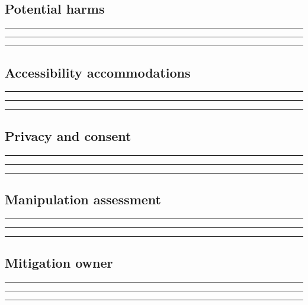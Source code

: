 \documentclass[11pt]{article}
\begin{document}
\subsection{Potential harms}
\noindent\rule{\linewidth}{0.3pt}\par\vspace{0.18in}
\noindent\rule{\linewidth}{0.3pt}\par\vspace{0.18in}
\noindent\rule{\linewidth}{0.3pt}\par\vspace{0.14in}

\subsection{Accessibility accommodations}
\noindent\rule{\linewidth}{0.3pt}\par\vspace{0.18in}
\noindent\rule{\linewidth}{0.3pt}\par\vspace{0.18in}
\noindent\rule{\linewidth}{0.3pt}\par\vspace{0.14in}

\subsection{Privacy and consent}
\noindent\rule{\linewidth}{0.3pt}\par\vspace{0.18in}
\noindent\rule{\linewidth}{0.3pt}\par\vspace{0.18in}
\noindent\rule{\linewidth}{0.3pt}\par\vspace{0.14in}

\subsection{Manipulation assessment}
\noindent\rule{\linewidth}{0.3pt}\par\vspace{0.18in}
\noindent\rule{\linewidth}{0.3pt}\par\vspace{0.18in}
\noindent\rule{\linewidth}{0.3pt}\par\vspace{0.14in}

\subsection{Mitigation owner}
\noindent\rule{\linewidth}{0.3pt}\par\vspace{0.18in}
\noindent\rule{\linewidth}{0.3pt}\par\vspace{0.18in}
\noindent\rule{\linewidth}{0.3pt}\par\vspace{0.14in}
\end{document}
